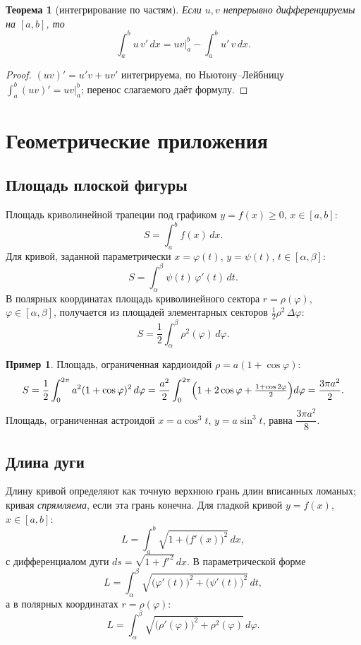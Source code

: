 \documentclass[11pt,a4paper]{article}
\theoremstyle{definition}
\newtheorem{example}[definition]{Пример}
\theoremstyle{plain}
\newtheorem{theorem}[definition]{Теорема}
\newcommand{\dx}{\,dx}
\newcommand{\dt}{\,dt}
\renewcommand{\ge}{\geqslant}
\begin{document}
\begin{theorem}[интегрирование по частям]
Если $u,v$ непрерывно дифференцируемы на $[a,b]$, то
\[
  \int_a^b u\,v'\dx=u v\Big|_a^b-\int_a^b u'\,v\dx .
\]
\end{theorem}

\begin{proof}
$(uv)'=u'v+uv'$ интегрируема, по Ньютону–Лейбницу $\int_a^b(uv)'=uv\big|_a^b$; перенос слагаемого
даёт формулу.
\end{proof}

\section{Геометрические приложения}

\subsection{Площадь плоской фигуры}

Площадь криволинейной трапеции под графиком $y=f(x)\ge0$, $x\in[a,b]$:
\[
  S=\int_a^b f(x)\dx .
\]
Для кривой, заданной параметрически $x=\varphi(t)$, $y=\psi(t)$, $t\in[\alpha,\beta]$:
\[
  S=\int_\alpha^\beta \psi(t)\,\varphi'(t)\dt .
\]
В полярных координатах площадь криволинейного сектора $r=\rho(\varphi)$,
$\varphi\in[\alpha,\beta]$, получается из площадей элементарных секторов
$\tfrac12\rho^2\,\Delta\varphi$:
\[
  S=\frac12\int_\alpha^\beta \rho^2(\varphi)\,d\varphi .
\]

\begin{example}
Площадь, ограниченная кардиоидой $\rho=a(1+\cos\varphi)$:
\[
  S=\frac12\int_0^{2\pi}a^2(1+\cos\varphi)^2\,d\varphi=\frac{a^2}{2}\int_0^{2\pi}
   \Bigl(1+2\cos\varphi+\tfrac{1+\cos2\varphi}{2}\Bigr)d\varphi=\frac{3\pi a^2}{2}.
\]
Площадь, ограниченная астроидой $x=a\cos^3t$, $y=a\sin^3t$, равна $\dfrac{3\pi a^2}{8}$.
\end{example}

\subsection{Длина дуги}

Длину кривой определяют как точную верхнюю грань длин вписанных ломаных; кривая
\emph{спрямляема}, если эта грань конечна. Для гладкой кривой $y=f(x)$, $x\in[a,b]$:
\[
  L=\int_a^b\sqrt{1+\bigl(f'(x)\bigr)^2}\dx,
\]
с дифференциалом дуги $ds=\sqrt{1+f'^2}\dx$. В параметрической форме
\[
  L=\int_\alpha^\beta\sqrt{\bigl(\varphi'(t)\bigr)^2+\bigl(\psi'(t)\bigr)^2}\dt,
\]
а в полярных координатах $r=\rho(\varphi)$:
\[
  L=\int_\alpha^\beta\sqrt{\bigl(\rho'(\varphi)\bigr)^2+\rho^2(\varphi)}\,d\varphi .
\]
\end{document}
